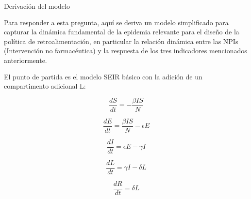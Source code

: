 \documentclass{beamer}
\begin{document}

\begin{frame}{Derivación del modelo}
\begin{justify}
{\footnotesize

Para responder a esta pregunta, aquí se deriva un modelo simplificado para capturar la dinámica fundamental de la epidemia relevante para el diseño de la política de retroalimentación, en particular la relación dinámica entre las NPIs (Intervención no farmacéutica) y la respuesta de los tres indicadores mencionados anteriormente.

\vspace{0.2 cm}
El punto de partida es el modelo SEIR básico con la adición de un compartimento adicional L:
 
\begin{equation}
    \frac{dS}{dt} = -\frac{\beta IS}{N}
\end{equation}

\begin{equation}
    \frac{dE}{dt} = \frac{\beta IS}{N} - \epsilon E
\end{equation}

\begin{equation}
    \frac{dI}{dt} = \epsilon E - \gamma I
\end{equation}

\begin{equation}
    \frac{dL}{dt} = \gamma I - \delta L
\end{equation}

\begin{equation}
    \frac{dR}{dt} = \delta L
\end{equation}
}


\end{justify}
\end{frame}
\end{document}

